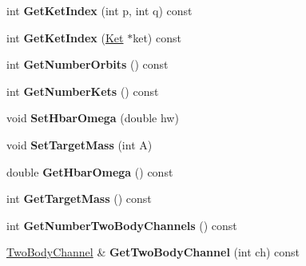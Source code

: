 \begin{DoxyCompactItemize}
\item 
\hypertarget{classModelSpace_ad2622b2d268c55b89a2082189f7185b1}{int {\bfseries Get\-Ket\-Index} (int p, int q) const }\label{classModelSpace_ad2622b2d268c55b89a2082189f7185b1}

\item 
\hypertarget{classModelSpace_ae87e8738f2aed2f23eab933b77a3772f}{int {\bfseries Get\-Ket\-Index} (\hyperlink{classKet}{Ket} $\ast$ket) const }\label{classModelSpace_ae87e8738f2aed2f23eab933b77a3772f}

\item 
\hypertarget{classModelSpace_a48004a4a3d559081827da87c9c4bfe94}{int {\bfseries Get\-Number\-Orbits} () const }\label{classModelSpace_a48004a4a3d559081827da87c9c4bfe94}

\item 
\hypertarget{classModelSpace_a2a46d43beb6d4e2de8c978ff921f4047}{int {\bfseries Get\-Number\-Kets} () const }\label{classModelSpace_a2a46d43beb6d4e2de8c978ff921f4047}

\item 
\hypertarget{classModelSpace_abc4f6a563b71977d1e0a99eb5367a2d7}{void {\bfseries Set\-Hbar\-Omega} (double hw)}\label{classModelSpace_abc4f6a563b71977d1e0a99eb5367a2d7}

\item 
\hypertarget{classModelSpace_ab29013a1b7b4b8b26d5905f97c135931}{void {\bfseries Set\-Target\-Mass} (int A)}\label{classModelSpace_ab29013a1b7b4b8b26d5905f97c135931}

\item 
\hypertarget{classModelSpace_a4cf15b20d8262cdab4ab1cadd412de7f}{double {\bfseries Get\-Hbar\-Omega} () const }\label{classModelSpace_a4cf15b20d8262cdab4ab1cadd412de7f}

\item 
\hypertarget{classModelSpace_a2f6a8428767c064a63796d4fc010e41e}{int {\bfseries Get\-Target\-Mass} () const }\label{classModelSpace_a2f6a8428767c064a63796d4fc010e41e}

\item 
\hypertarget{classModelSpace_a7c0b9152d68e069f9774078bd2a429b7}{int {\bfseries Get\-Number\-Two\-Body\-Channels} () const }\label{classModelSpace_a7c0b9152d68e069f9774078bd2a429b7}

\item 
\hypertarget{classModelSpace_ab2c315fd347fe93dd63246dea3d02f35}{\hyperlink{classTwoBodyChannel}{Two\-Body\-Channel} \& {\bfseries Get\-Two\-Body\-Channel} (int ch) const }\label{classModelSpace_ab2c315fd347fe93dd63246dea3d02f35}


\end{DoxyCompactItemize}
